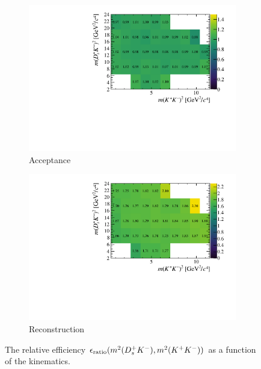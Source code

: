 \begin{figure}[!h]
   \centering
   \begin{subfigure}[t]{0.4\textwidth}
      \includegraphics[width=1.0\textwidth]{figs/B2DsKK/Relative_Eff_gen_All_Full.pdf}
      \caption{Acceptance}
      \label{fig:B2DsKK_releff_acceptance}
   \end{subfigure}
   \begin{subfigure}[t]{0.4\textwidth}
      \includegraphics[width=1.0\textwidth]{figs/B2DsKK/Relative_Eff_reco_All.pdf}
      \caption{Reconstruction}
      \label{fig:B2DsKK_releff_reconstruction}
   \end{subfigure}
   \caption{The relative efficiency $\epsilon_{\text{ratio}}(m^{2}({{D}^+_{s}}{{K}^-}),m^{2}({{K}^+}{{K}^-}))$ as a function of the \decay{\Bp}{\Dsp\Kp\Km} kinematics.}
   \label{fig:B2DsKK_dalitz_eff_one}
\end{figure}


